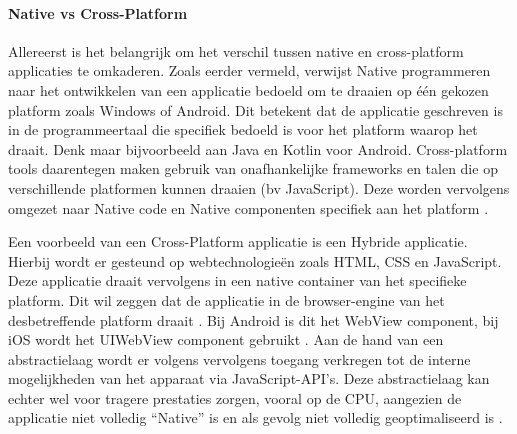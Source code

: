 \paragraph{Native vs Cross-Platform}
Allereerst is het belangrijk om het verschil tussen native en cross-platform applicaties te omkaderen. Zoals eerder vermeld, verwijst Native programmeren naar het ontwikkelen van een applicatie bedoeld om te draaien op één gekozen platform zoals Windows of Android. Dit betekent dat de applicatie geschreven is in de programmeertaal die specifiek bedoeld is voor het platform waarop het draait. Denk maar bijvoorbeeld aan Java en Kotlin voor Android. Cross-platform tools daarentegen maken gebruik van onafhankelijke frameworks en talen die op verschillende platformen kunnen draaien (bv JavaScript). Deze worden vervolgens omgezet naar Native code en Native componenten specifiek aan het platform \autocite{Bron2}.

Een voorbeeld van een Cross-Platform applicatie is een Hybride applicatie. Hierbij wordt er gesteund op webtechnologieën zoals HTML, CSS en JavaScript. Deze applicatie draait vervolgens in een native container van het specifieke platform. Dit wil zeggen dat de applicatie in de browser-engine van het desbetreffende platform draait \autocite{Bron6}. Bij Android is dit het WebView component, bij iOS wordt het UIWebView component gebruikt \autocite{Bron4}. Aan de hand van een abstractielaag wordt er volgens \textcite{Bron6} vervolgens toegang verkregen tot de interne mogelijkheden van het apparaat via JavaScript-API's. Deze abstractielaag kan echter wel voor tragere prestaties zorgen, vooral op de CPU, aangezien de applicatie niet volledig ``Native'' is en als gevolg niet volledig geoptimaliseerd is \autocite{Bron1}.

